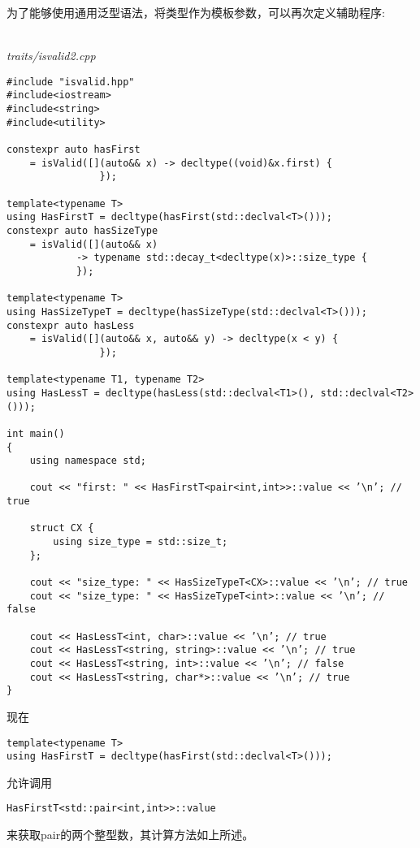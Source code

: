 为了能够使用通用泛型语法，将类型作为模板参数，可以再次定义辅助程序:

\hspace*{\fill} \\ %
\noindent
\textit{traits/isvalid2.cpp}
\begin{lstlisting}[style=styleCXX]
#include "isvalid.hpp"
#include<iostream>
#include<string>
#include<utility>

constexpr auto hasFirst
	= isValid([](auto&& x) -> decltype((void)&x.first) {
				});
			
template<typename T>
using HasFirstT = decltype(hasFirst(std::declval<T>()));
constexpr auto hasSizeType
	= isValid([](auto&& x)
			-> typename std::decay_t<decltype(x)>::size_type {
			});

template<typename T>
using HasSizeTypeT = decltype(hasSizeType(std::declval<T>()));
constexpr auto hasLess
	= isValid([](auto&& x, auto&& y) -> decltype(x < y) {
				});

template<typename T1, typename T2>
using HasLessT = decltype(hasLess(std::declval<T1>(), std::declval<T2>()));

int main()
{
	using namespace std;
	
	cout << "first: " << HasFirstT<pair<int,int>>::value << ’\n’; // true
	
	struct CX {
		using size_type = std::size_t;
	};

	cout << "size_type: " << HasSizeTypeT<CX>::value << ’\n’; // true
	cout << "size_type: " << HasSizeTypeT<int>::value << ’\n’; // false
	
	cout << HasLessT<int, char>::value << ’\n’; // true
	cout << HasLessT<string, string>::value << ’\n’; // true
	cout << HasLessT<string, int>::value << ’\n’; // false
	cout << HasLessT<string, char*>::value << ’\n’; // true
}
\end{lstlisting}

现在

\begin{lstlisting}[style=styleCXX]
template<typename T>
using HasFirstT = decltype(hasFirst(std::declval<T>()));
\end{lstlisting}

允许调用

\begin{lstlisting}[style=styleCXX]
HasFirstT<std::pair<int,int>>::value
\end{lstlisting}

来获取pair的两个整型数，其计算方法如上所述。










